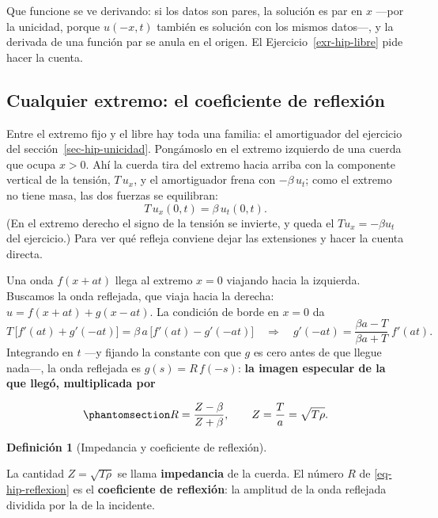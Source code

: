 \documentclass[
  spanish,
  a4paper,
]{scrbook}
\theoremstyle{definition}
\newtheorem{definition}{Definición}[chapter]
\theoremstyle{plain}
\theoremstyle{definition}
\theoremstyle{plain}
\theoremstyle{definition}
\theoremstyle{remark}
\begin{document}
Que funcione se ve derivando: si los datos son pares, la solución es par
en \(x\) ---por la unicidad, porque \(u(-x,t)\) también es solución con
los mismos datos---, y la derivada de una función par se anula en el
origen. El Ejercicio~\ref{exr-hip-libre} pide hacer la cuenta.

\subsection{Cualquier extremo: el coeficiente de
reflexión}\label{sec-hip-coef-reflexion}

Entre el extremo fijo y el libre hay toda una familia: el amortiguador
del ejercicio del sección~\ref{sec-hip-unicidad}. Pongámoslo en el
extremo izquierdo de una cuerda que ocupa \(x>0\). Ahí la cuerda tira
del extremo hacia arriba con la componente vertical de la tensión,
\(T\,u_x\), y el amortiguador frena con \(-\beta\,u_t\); como el extremo
no tiene masa, las dos fuerzas se equilibran: \[
T\,u_x(0,t) = \beta\,u_t(0,t).
\] (En el extremo derecho el signo de la tensión se invierte, y queda el
\(T u_x = -\beta u_t\) del ejercicio.) Para ver qué refleja conviene
dejar las extensiones y hacer la cuenta directa.

Una onda \(f(x+at)\) llega al extremo \(x=0\) viajando hacia la
izquierda. Buscamos la onda reflejada, que viaja hacia la derecha:
\(u = f(x+at) + g(x-at)\). La condición de borde en \(x=0\) da \[
T\,\big[f'(at)+g'(-at)\big] = \beta\,a\,\big[f'(at) - g'(-at)\big]
\quad\Longrightarrow\quad
g'(-at) = \frac{\beta a - T}{\beta a + T}\;f'(at).
\] Integrando en \(t\) ---y fijando la constante con que \(g\) es cero
antes de que llegue nada---, la onda reflejada es \(g(s) = R\,f(-s)\):
\textbf{la imagen especular de la que llegó, multiplicada por}

\begin{equation}\protect\phantomsection\label{eq-hip-reflexion}{
R = \frac{Z-\beta}{Z+\beta}, \qquad Z = \frac{T}{a} = \sqrt{T\rho}.
}\end{equation}

\begin{definition}[Impedancia y coeficiente de
reflexión]\protect\hypertarget{def-hip-impedancia}{}\label{def-hip-impedancia}

La cantidad \(Z = \sqrt{T\rho}\) se llama \textbf{impedancia} de la
cuerda. El número \(R\) de \ref{eq-hip-reflexion} es el
\textbf{coeficiente de reflexión}: la amplitud de la onda reflejada
dividida por la de la incidente.

\end{definition}
\end{document}
